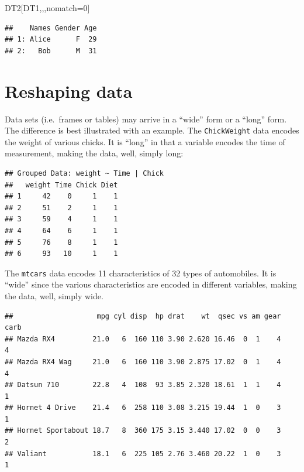 \documentclass[]{book}
\newenvironment{Shaded}{\begin{snugshade}}{\end{snugshade}}
\newcommand{\DecValTok}[1]{\textcolor[rgb]{0.00,0.00,0.81}{#1}}
\newcommand{\NormalTok}[1]{#1}
\newcommand{\OperatorTok}[1]{\textcolor[rgb]{0.81,0.36,0.00}{\textbf{#1}}}
\newcommand{\StringTok}[1]{\textcolor[rgb]{0.31,0.60,0.02}{#1}}
\theoremstyle{definition}
\theoremstyle{definition}
\theoremstyle{definition}
\theoremstyle{remark}
\begin{document}
\begin{Shaded}
\begin{Highlighting}[]
\NormalTok{DT2[DT1,,,nomatch=}\DecValTok{0}\NormalTok{]}
\end{Highlighting}
\end{Shaded}

\begin{verbatim}
##    Names Gender Age
## 1: Alice      F  29
## 2:   Bob      M  31
\end{verbatim}

\hypertarget{reshaping-data}{%
\section{Reshaping data}\label{reshaping-data}}

Data sets (i.e.~frames or tables) may arrive in a ``wide'' form or a ``long'' form.
The difference is best illustrated with an example.
The \texttt{ChickWeight} data encodes the weight of various chicks. It is ``long'' in that a variable encodes the time of measurement, making the data, well, simply long:

\begin{Shaded}
\end{Shaded}

\begin{verbatim}
## Grouped Data: weight ~ Time | Chick
##   weight Time Chick Diet
## 1     42    0     1    1
## 2     51    2     1    1
## 3     59    4     1    1
## 4     64    6     1    1
## 5     76    8     1    1
## 6     93   10     1    1
\end{verbatim}

The \texttt{mtcars} data encodes 11 characteristics of 32 types of automobiles. It is ``wide'' since the various characteristics are encoded in different variables, making the data, well, simply wide.

\begin{Shaded}
\end{Shaded}

\begin{verbatim}
##                    mpg cyl disp  hp drat    wt  qsec vs am gear carb
## Mazda RX4         21.0   6  160 110 3.90 2.620 16.46  0  1    4    4
## Mazda RX4 Wag     21.0   6  160 110 3.90 2.875 17.02  0  1    4    4
## Datsun 710        22.8   4  108  93 3.85 2.320 18.61  1  1    4    1
## Hornet 4 Drive    21.4   6  258 110 3.08 3.215 19.44  1  0    3    1
## Hornet Sportabout 18.7   8  360 175 3.15 3.440 17.02  0  0    3    2
## Valiant           18.1   6  225 105 2.76 3.460 20.22  1  0    3    1
\end{verbatim}
\end{document}
